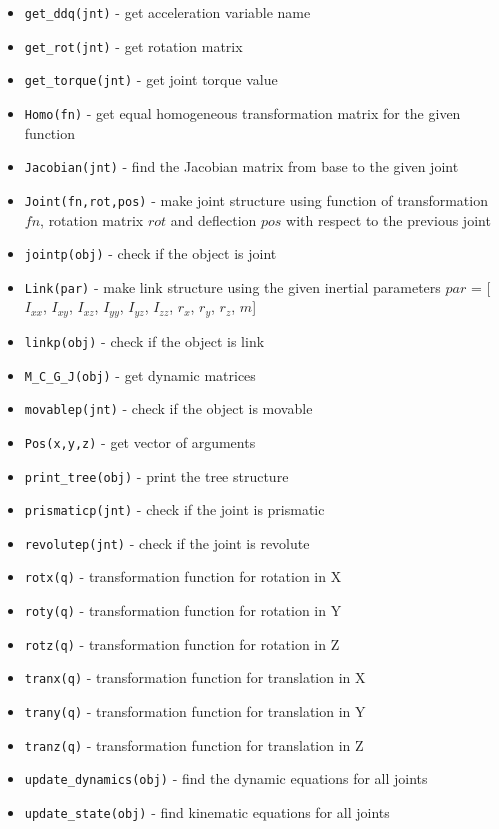 \documentclass{article}
\begin{document}
\begin{itemize}
    \item \texttt{get\_ddq(jnt)} - get acceleration variable name
    \item \texttt{get\_rot(jnt)} - get rotation matrix
    \item \texttt{get\_torque(jnt)} - get joint torque value 
    \item \texttt{Homo(fn)} - get equal homogeneous transformation matrix for the given function
    \item \texttt{Jacobian(jnt)} - find the Jacobian matrix from base to the given joint
    \item \texttt{Joint(fn,rot,pos)} - make joint structure using function of transformation $fn$, rotation matrix $rot$ and deflection $pos$ with respect to the previous joint
    \item \texttt{jointp(obj)} - check if the object is joint
    \item \texttt{Link(par)} - make link structure using the given inertial parameters $par$ = [$I_{xx}$, $I_{xy}$, $I_{xz}$, $I_{yy}$, $I_{yz}$, $I_{zz}$, $r_x$, $r_y$, $r_z$, $m$]
    \item \texttt{linkp(obj)} - check if the object is link
    \item \texttt{M\_C\_G\_J(obj)} - get dynamic matrices 
    \item \texttt{movablep(jnt)} - check if the object is movable
    \item \texttt{Pos(x,y,z)} - get vector of arguments
    \item \texttt{print\_tree(obj)} - print the tree structure
    \item \texttt{prismaticp(jnt)} - check if the joint is prismatic 
    \item \texttt{revolutep(jnt)} - check if the joint is revolute
    \item \texttt{rotx(q)} - transformation function for rotation in X
    \item \texttt{roty(q)} - transformation function for rotation in Y
    \item \texttt{rotz(q)} - transformation function for rotation in Z
    \item \texttt{tranx(q)} - transformation function for translation in X
    \item \texttt{trany(q)} - transformation function for translation in Y
    \item \texttt{tranz(q)} - transformation function for translation in Z
    \item \texttt{update\_dynamics(obj)} - find the dynamic equations for all joints
    \item \texttt{update\_state(obj)} - find kinematic equations for all joints 
\end{itemize}
\end{document}
